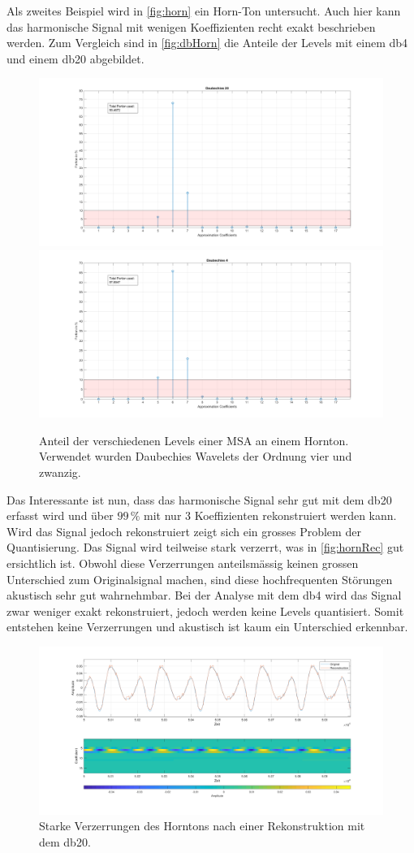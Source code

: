 \begin{refsection}
Als zweites Beispiel wird in \autoref{fig:horn} ein Horn-Ton untersucht.
Auch hier kann das harmonische Signal mit wenigen Koeffizienten recht exakt beschrieben werden. 
Zum Vergleich sind in \autoref{fig:dbHorn} die Anteile der Levels mit einem db4 und einem db20 abgebildet.
\begin{figure}
	\includegraphics[width=0.5\linewidth]{papers/compress/Bilder/frenchHorn_db20.pdf}
	\includegraphics[width=0.5\linewidth]{papers/compress/Bilder/frenchHorn_db4.pdf}
	\caption{Anteil der verschiedenen Levels einer MSA an einem Hornton. Verwendet wurden Daubechies Wavelets der Ordnung vier und zwanzig.}
	\label{fig:dbHorn}
\end{figure}
Das Interessante ist nun, dass das harmonische Signal sehr gut mit dem db20 erfasst wird und über $99\,\text{\%}$ mit nur 3 Koeffizienten rekonstruiert werden kann.
Wird das Signal jedoch rekonstruiert zeigt sich ein grosses Problem der Quantisierung.
Das Signal wird teilweise stark verzerrt, was in \autoref{fig:hornRec} gut ersichtlich ist.
Obwohl diese Verzerrungen anteilsmässig keinen grossen Unterschied zum Originalsignal machen, sind diese hochfrequenten Störungen akustisch sehr gut wahrnehmbar.
Bei der Analyse mit dem db4 wird das Signal zwar weniger exakt rekonstruiert, jedoch werden keine Levels quantisiert.
Somit entstehen keine Verzerrungen und akustisch ist kaum ein Unterschied erkennbar.
\begin{figure}
	\centering
	\includegraphics[width=\linewidth]{papers/compress/Bilder/frenchHorn_rec}
	\caption{Starke Verzerrungen des Horntons nach einer Rekonstruktion mit dem db20.}
	\label{fig:hornRec}
\end{figure}


\end{refsection}
